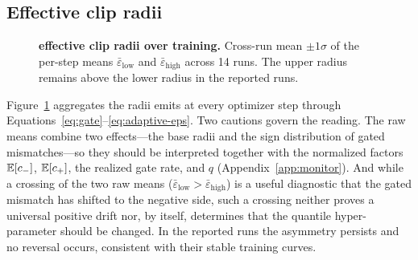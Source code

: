\iffalse
\subsection{Effective clip radii}
\label{sec:exp-radius}

\begin{figure}[htbp]
\centering
{}
\caption{\textbf{\satr{} effective clip radii over training.} Cross-run mean $\pm 1\sigma$ of the per-step means $\bar\varepsilon_{\mathrm{low}}$ and $\bar\varepsilon_{\mathrm{high}}$ across 14 \satr{} runs. The upper radius remains above the lower radius in the reported runs.}
\label{fig:eps}
\end{figure}

Figure~\ref{fig:eps} aggregates the radii \satr{} emits at every optimizer step through Equations~\eqref{eq:gate}--\eqref{eq:adaptive-eps}. Two cautions govern the reading. The raw means combine two effects---the base radii and the sign distribution of gated mismatches---so they should be interpreted together with the normalized factors $\mathbb{E}[c_-]$, $\mathbb{E}[c_+]$, the realized gate rate, and $q$ (Appendix~\ref{app:monitor}). And while a crossing of the two raw means ($\bar\varepsilon_{\mathrm{low}}>\bar\varepsilon_{\mathrm{high}}$) is a useful diagnostic that the gated mismatch has shifted to the negative side, such a crossing neither proves a universal positive drift nor, by itself, determines that the quantile hyper-parameter should be changed. In the reported runs the asymmetry persists and no reversal occurs, consistent with their stable training curves.

